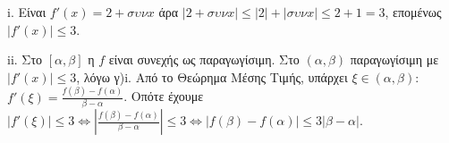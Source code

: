 \begin{alist}
\item [\(\gamma\)]
\begin{rlist}
\item i. Είναι $f'(x)=2+\sigma\upsilon\nu x$ άρα $|2+\sigma\upsilon\nu x| \leq |2|+|\sigma\upsilon\nu x| \leq 2+1=3$, επομένως $|f'(x)|\leq 3$.
\item ii. Στο $[\alpha, \beta]$ η $f$ είναι συνεχής ως παραγωγίσιμη. Στο $(\alpha, \beta)$ παραγωγίσιμη με $|f'(x)|\leq 3$, λόγω γ)i.
Από το Θεώρημα Μέσης Τιμής, υπάρχει $\xi \in (\alpha, \beta)$: $f'(\xi) = \frac{f(\beta)-f(\alpha)}{\beta-\alpha}$.
Οπότε έχουμε $|f'(\xi)|\leq 3 \Leftrightarrow \left|\frac{f(\beta)-f(\alpha)}{\beta-\alpha}\right|\leq 3 \Leftrightarrow |f(\beta)-f(\alpha)|\leq 3|\beta-\alpha|$.
\end{rlist}
\end{alist}